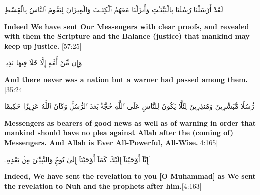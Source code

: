 \begin{center}
    \begin{RLtext}
        لَقَدْ أَرْسَلْنَا رُسُلَنَا بِالْبَيِّنَـٰتِ وَأَنزَلْنَا مَعَهُمُ ٱلْكِتَـٰبَ وَالْمِيزَانَ لِيَقُومَ ٱلنَّاسُ بِالْقِسْطِ 
    \end{RLtext}
\end{center}
\textbf{Indeed We have sent Our Messengers with clear proofs, and revealed with them the Scripture and the Balance (justice) that mankind may keep up justice.} [57:25]

\begin{center}
    \begin{RLtext}
        وَإِن مِّنْ أُمَّةٍ إِلَّا خَلَا فِيهَا نَذِيرٌۭ
    \end{RLtext}
    \textbf{And there never was a nation but a warner had passed among them.} [35:24]
\end{center}
\begin{center}
    \begin{RLtext}
        رُّسُلٗا مُّبَشِّرِينَ وَمُنذِرِينَ لِئَلَّا يَكُونَ لِلنَّاسِ عَلَى ٱللَّهِ حُجَّةُۢ بَعۡدَ ٱلرُّسُلِۚ وَكَانَ ٱللَّهُ عَزِيزًا حَكِيمٗا

    \end{RLtext}
\end{center}
\textbf{Messengers as bearers of good news as well as of warning in order that mankind should have no plea against Allah after the (coming of) Messengers. And Allah is Ever All-Powerful, All-Wise.}[4:165]
\begin{center}
    \begin{RLtext}
         إِنَّآ أَوْحَيْنَآ إِلَيْكَ كَمَآ أَوْحَيْنَآ إِلَىٰ نُوحٍۢ وَالنَّبِيِّـۧنَ مِنۢ بَعْدِهِۦ ۚ
    \end{RLtext}
\end{center}
\textbf{Indeed, We have sent the revelation to you [O Muhammad] as We sent the revelation to Nuh and the prophets after him.}[4:163]

